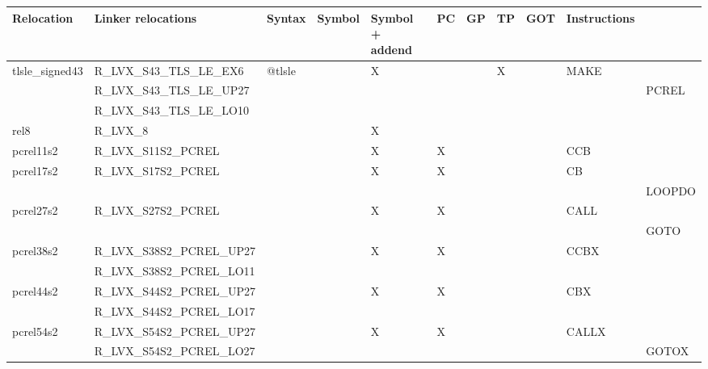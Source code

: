{\tiny
\begin{tabular}{|l|l|l|l|l|l|l|l|l|l|l|} \hline
\textsf{Relocation} & \textsf{Linker relocations} & \textsf{Syntax} & \textsf{Symbol} & \textsf{Symbol + addend} & \textsf{PC} & \textsf{GP} & \textsf{TP} & \textsf{GOT} & \textsf{Instructions} \\
\hline
\textsf{tlsle\_signed43} & \textsf{R\_LVX\_S43\_TLS\_LE\_EX6} & \textsf{@tlsle} & \textsf{} & \textsf{X} & \textsf{} & \textsf{} & \textsf{X} & \textsf{} & \textsf{MAKE} \\
 & \textsf{R\_LVX\_S43\_TLS\_LE\_UP27} & & & & & & & & & \textsf{PCREL} \\
 & \textsf{R\_LVX\_S43\_TLS\_LE\_LO10} & & & & & & & & & \\
\hline
\textsf{rel8} & \textsf{R\_LVX\_8} & \textsf{} & \textsf{} & \textsf{X} & \textsf{} & \textsf{} & \textsf{} & \textsf{} & \textsf{} \\
\hline
\textsf{pcrel11s2} & \textsf{R\_LVX\_S11S2\_PCREL} & \textsf{} & \textsf{} & \textsf{X} & \textsf{X} & \textsf{} & \textsf{} & \textsf{} & \textsf{CCB} \\
\hline
\textsf{pcrel17s2} & \textsf{R\_LVX\_S17S2\_PCREL} & \textsf{} & \textsf{} & \textsf{X} & \textsf{X} & \textsf{} & \textsf{} & \textsf{} & \textsf{CB} \\
 & & & & & & & & & & \textsf{LOOPDO} \\
\hline
\textsf{pcrel27s2} & \textsf{R\_LVX\_S27S2\_PCREL} & \textsf{} & \textsf{} & \textsf{X} & \textsf{X} & \textsf{} & \textsf{} & \textsf{} & \textsf{CALL} \\
 & & & & & & & & & & \textsf{GOTO} \\
\hline
\textsf{pcrel38s2} & \textsf{R\_LVX\_S38S2\_PCREL\_UP27} & \textsf{} & \textsf{} & \textsf{X} & \textsf{X} & \textsf{} & \textsf{} & \textsf{} & \textsf{CCBX} \\
 & \textsf{R\_LVX\_S38S2\_PCREL\_LO11} & & & & & & & & & \\
\hline
\textsf{pcrel44s2} & \textsf{R\_LVX\_S44S2\_PCREL\_UP27} & \textsf{} & \textsf{} & \textsf{X} & \textsf{X} & \textsf{} & \textsf{} & \textsf{} & \textsf{CBX} \\
 & \textsf{R\_LVX\_S44S2\_PCREL\_LO17} & & & & & & & & & \\
\hline
\textsf{pcrel54s2} & \textsf{R\_LVX\_S54S2\_PCREL\_UP27} & \textsf{} & \textsf{} & \textsf{X} & \textsf{X} & \textsf{} & \textsf{} & \textsf{} & \textsf{CALLX} \\
 & \textsf{R\_LVX\_S54S2\_PCREL\_LO27} & & & & & & & & & \textsf{GOTOX} \\
\hline
\end{tabular}
}

